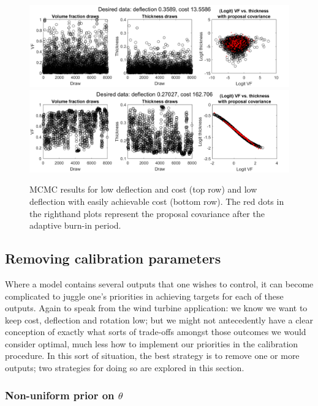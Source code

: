 \documentclass{article}
\begin{document}
\begin{figure}
\centering
\includegraphics[width=.9\linewidth]{FIG1}
\includegraphics[width=.9\linewidth]{FIG2}
\captionsetup{width=.9\linewidth}
\caption{MCMC results for low deflection and cost (top row) and low deflection with easily achievable cost (bottom row). The red dots in the righthand plots represent the proposal covariance after the adaptive burn-in period.}
\label{fig:des_data}
\end{figure}

\subsection{Removing calibration parameters}\label{removing_cal_pars}


Where a model contains several outputs that one wishes to control, it can become complicated to juggle one's priorities in achieving targets for each of these outputs. Again to speak from the wind turbine application: we know we want to keep cost, deflection and rotation low; but we might not antecedently have a clear conception of exactly what sorts of trade-offs amongst those outcomes we would consider optimal, much less how to implement our priorities in the calibration procedure. In this sort of situation, the best strategy is to remove one or more outputs; two strategies for doing so are explored in this section.

\subsubsection{Non-uniform prior on $\theta$}\label{non-uniform_prior}
\end{document}
